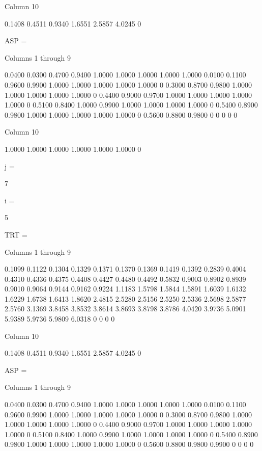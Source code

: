   Column 10

    0.1408
    0.4511
    0.9340
    1.6551
    2.5857
    4.0245
         0


ASP =

  Columns 1 through 9

    0.0400    0.0300    0.4700    0.9400    1.0000    1.0000    1.0000    1.0000    1.0000
    0.0100    0.1100    0.9600    0.9900    1.0000    1.0000    1.0000    1.0000    1.0000
         0    0.3000    0.8700    0.9800    1.0000    1.0000    1.0000    1.0000    1.0000
         0    0.4400    0.9000    0.9700    1.0000    1.0000    1.0000    1.0000    1.0000
         0    0.5100    0.8400    1.0000    0.9900    1.0000    1.0000    1.0000    1.0000
         0    0.5400    0.8900    0.9800    1.0000    1.0000    1.0000    1.0000    1.0000
         0    0.5600    0.8800    0.9800         0         0         0         0         0

  Column 10

    1.0000
    1.0000
    1.0000
    1.0000
    1.0000
    1.0000
         0


j =

     7


i =

     5


TRT =

  Columns 1 through 9

    0.1099    0.1122    0.1304    0.1329    0.1371    0.1370    0.1369    0.1419    0.1392
    0.2839    0.4004    0.4310    0.4336    0.4375    0.4408    0.4427    0.4480    0.4492
    0.5832    0.9003    0.8902    0.8939    0.9010    0.9064    0.9144    0.9162    0.9224
    1.1183    1.5798    1.5844    1.5891    1.6039    1.6132    1.6229    1.6738    1.6413
    1.8620    2.4815    2.5280    2.5156    2.5250    2.5336    2.5698    2.5877    2.5760
    3.1369    3.8458    3.8532    3.8614    3.8693    3.8798    3.8786    4.0420    3.9736
    5.0901    5.9389    5.9736    5.9809    6.0318         0         0         0         0

  Column 10

    0.1408
    0.4511
    0.9340
    1.6551
    2.5857
    4.0245
         0


ASP =

  Columns 1 through 9

    0.0400    0.0300    0.4700    0.9400    1.0000    1.0000    1.0000    1.0000    1.0000
    0.0100    0.1100    0.9600    0.9900    1.0000    1.0000    1.0000    1.0000    1.0000
         0    0.3000    0.8700    0.9800    1.0000    1.0000    1.0000    1.0000    1.0000
         0    0.4400    0.9000    0.9700    1.0000    1.0000    1.0000    1.0000    1.0000
         0    0.5100    0.8400    1.0000    0.9900    1.0000    1.0000    1.0000    1.0000
         0    0.5400    0.8900    0.9800    1.0000    1.0000    1.0000    1.0000    1.0000
         0    0.5600    0.8800    0.9800    0.9900         0         0         0         0

